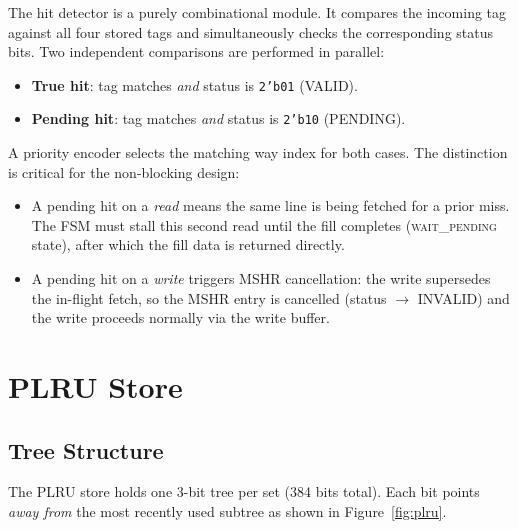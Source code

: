 \documentclass[12pt,letterpaper]{report}
\begin{document}
The hit detector is a purely combinational module.  It compares the
incoming tag against all four stored tags and simultaneously checks
the corresponding status bits.  Two independent comparisons are
performed in parallel:

\begin{itemize}
  \item \textbf{True hit}: tag matches \emph{and} status is
        \texttt{2'b01} (VALID).
  \item \textbf{Pending hit}: tag matches \emph{and} status is
        \texttt{2'b10} (PENDING).
\end{itemize}

A priority encoder selects the matching way index for both cases.
The distinction is critical for the non-blocking design:
\begin{itemize}
  \item A pending hit on a \emph{read} means the same line is being
        fetched for a prior miss.  The FSM must stall this second
        read until the fill completes (\textsc{wait\_pending} state),
        after which the fill data is returned directly.
  \item A pending hit on a \emph{write} triggers MSHR cancellation:
        the write supersedes the in-flight fetch, so the MSHR entry
        is cancelled (status $\to$ INVALID) and the write proceeds
        normally via the write buffer.
\end{itemize}

\section{PLRU Store}

\subsection{Tree Structure}

The PLRU store holds one 3-bit tree per set (384 bits total).  Each
bit points \emph{away from} the most recently used subtree as shown
in Figure~\ref{fig:plru}.
\end{document}
